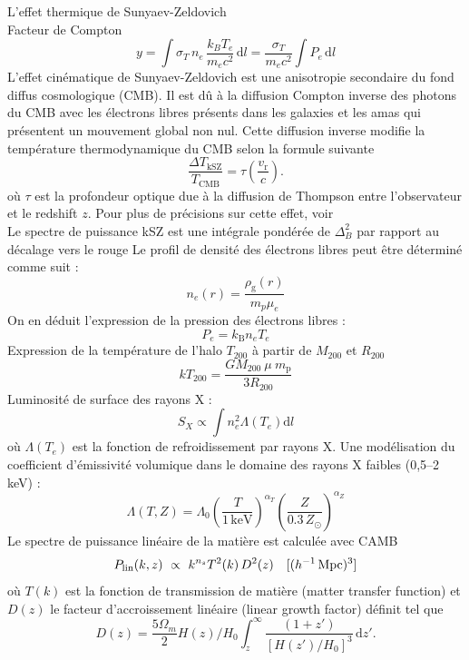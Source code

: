 \documentclass[a4paper, french, 11 pt]{article}
\newcommand{\deriv}{\mathrm{d}}
\begin{document}
L'effet thermique de Sunyaev-Zeldovich\\
Facteur de Compton
\begin{equation}
y = \int \sigma_T\, n_e\, \frac{k_B T_e}{m_e c^2}\, \deriv l
= \frac{\sigma_T}{m_e c^2}\int P_e\, \deriv l
\end{equation}
L'effet cinématique de Sunyaev-Zeldovich est une anisotropie secondaire du fond diffus cosmologique (CMB). Il est dû à la diffusion Compton inverse des photons du CMB avec les électrons libres présents dans les galaxies et les amas qui présentent un mouvement global non nul. Cette diffusion inverse modifie la température thermodynamique du CMB selon la formule suivante \cite{kovac2025baryonificationiiconstrainingfeedback} \cite{siegel2025jointxraykineticsunyaevzeldovich}
\begin{equation}
\frac{\Delta T_{\mathrm{kSZ}}}{T_{\mathrm{CMB}}}=\tau\left(\frac{v_\mathrm{r}}{c}\right).
\end{equation}
où $\tau$ est la profondeur optique due à la diffusion de Thompson entre l'observateur et le redshift $z$. Pour plus de précisions sur cette effet, voir \cite{bigwood2025kineticsunyaevzeldovicheffect}\\
Le spectre de puissance kSZ est une intégrale pondérée de $\Delta_B^2$ par rapport au décalage vers le rouge
Le profil de densité des électrons libres peut être déterminé comme suit :
\begin{equation}
n_e(r)=\frac{\rho_\text{g}(r)}{m_p\mu_e}
\end{equation}
On en déduit l'expression de la pression des électrons libres :
\begin{equation}
P_e=k_\text{B}n_eT_e
\end{equation}
Expression de la température de l'halo $T_{200}$ à partir de $M_{200}$ et $R_{200}$ \cite{Battaglia_2012}
\begin{equation}
\label{eq:T200}
kT_{200} = \frac{G M_{200} \ \mu\ m_\text{p}}{3 R_{200}}
\end{equation}
Luminosité de surface des rayons X :
\begin{equation}
S_X\propto\int n_e^2\Lambda(T_e)\deriv l
\end{equation}
où $\Lambda(T_e)$ est la fonction de refroidissement par rayons X. Une modélisation du coefficient d'émissivité volumique dans le domaine des rayons X faibles (0,5–2 keV) \cite{Oppenheimer_2025} :
\begin{equation}
\Lambda(T, Z) = \Lambda_0
    \left(\frac{T}{1\,\text{keV}}\right)^{\alpha_T}
    \left(\frac{Z}{0.3\,Z_\odot}\right)^{\alpha_Z}
\end{equation}
Le spectre de puissance linéaire de la matière est calculée avec CAMB \cite{Lewis_2000} 
\begin{equation}
P_{\rm lin}(k, z)\ \propto\ k^{n_s} T^2(k)\, D^2(z)
\quad [(h^{-1}\,{\rm Mpc})^3]
\end{equation}
où $T(k)$ est la fonction de transmission de matière (matter transfer function) et $D(z)$ le facteur d'accroissement linéaire (linear growth factor) définit tel que
\begin{equation}
D(z) = \frac{5\Omega_m}{2} H(z) / H_0
\int_z^\infty \frac{(1+z')}{[H(z')/H_0]^3}\,\deriv z'.
\end{equation}
\end{document}
